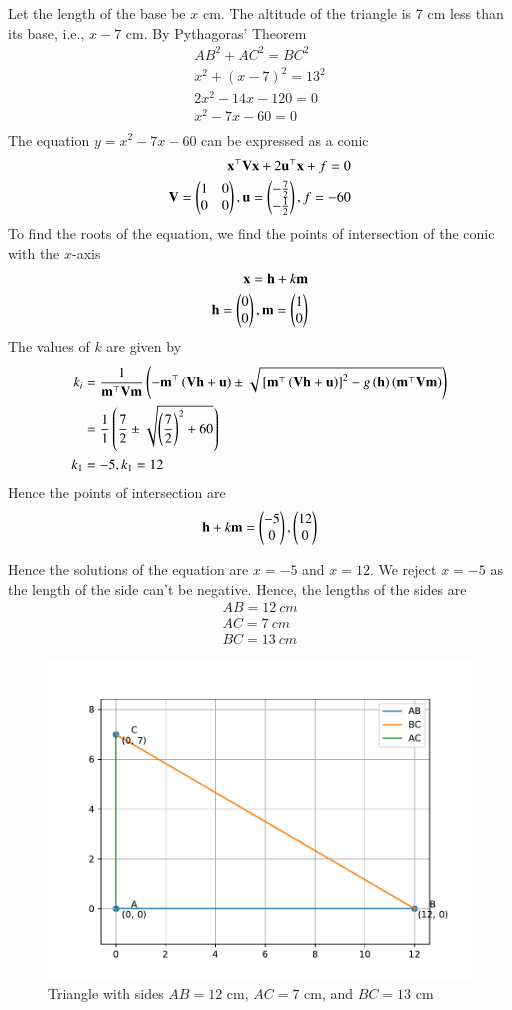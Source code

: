 \documentclass[journal]{IEEEtran}
\begin{document}
Let the length of the base be $x$ cm. The altitude of the triangle is 7 cm less than its base, i.e.,
$x - 7$ cm. By Pythagoras' Theorem
\begin{align}
    AB^2 + AC^2 = BC^2 \\
    x^2 + (x - 7)^2 = 13^2 \\
    2x^2 - 14x - 120 = 0 \\
    x^2 - 7x - 60 = 0 \\
\end{align}
The equation $y = x^2 - 7x - 60$ can be expressed as a conic
\begin{align}
    \mathbf{x}^\top\mathbf{V}\mathbf{x} + 2\mathbf{u}^\top\mathbf{x} + f = 0 \\
    \mathbf{V} = \begin{pmatrix}1 & 0 \\ 0 & 0\end{pmatrix}, \mathbf{u} = \begin{pmatrix}-\frac{7}{2} \\ -\frac{1}{2}\end{pmatrix}, f = -60
\end{align}
To find the roots of the equation, we find the points of intersection of the 
conic with the $x$-axis
\begin{align}
    \mathbf{x} = \mathbf{h} + k\mathbf{m} \\
    \mathbf{h} = \begin{pmatrix}0 \\ 0\end{pmatrix}, \mathbf{m} = \begin{pmatrix}1 \\ 0\end{pmatrix}
\end{align}
The values of $k$ are given by
\begin{align}
    k_i &= \frac{1}{\mathbf{m}^\top\mathbf{V}\mathbf{m}}\left(-\mathbf{m}^\top\left(\mathbf{V\mathbf{h} + \mathbf{u}}\right) \pm \sqrt{
        {}\left[\mathbf{m}^\top\left(\mathbf{V}\mathbf{h} + \mathbf{u}\right)\right]^2 - g\left(\mathbf{h}\right)\left(\mathbf{m}^\top\mathbf{V}\mathbf{m}\right)
    }\right) \\
    &= \frac{1}{1} \left(\frac{7}{2} \pm \sqrt{\left(\frac{7}{2}\right)^2 + 60}\right) \\
    k_1 &= -5, k_1 = 12
\end{align}
Hence the points of intersection are
\begin{align}
    \mathbf{h} + k\mathbf{m} = \begin{pmatrix}-5 \\ 0\end{pmatrix}, \begin{pmatrix}12 \\ 0\end{pmatrix}
\end{align}

Hence the solutions of the equation are $x = -5$ and $x = 12$. We reject $x = -5$ as the length of the side
can't be negative. Hence, the lengths of the sides are
\begin{align}
    AB = 12\ cm \\
    AC = 7\ cm \\
    BC = 13\ cm
\end{align}

\begin{figure}[h!]
    \centering
    \includegraphics[width=0.7\linewidth]{figs/fig.pdf}
    \caption{Triangle with sides $AB = 12$ cm, $AC = 7$ cm, and $BC = 13$ cm}
\end{figure}
\end{document}
